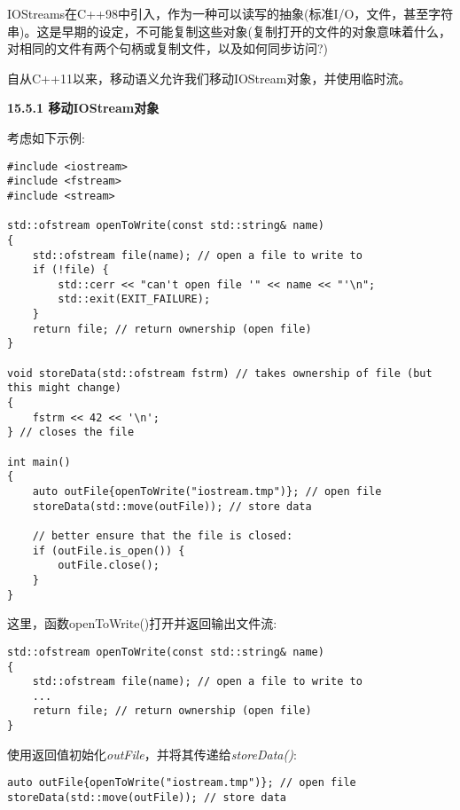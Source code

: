 IOStreams在C++98中引入，作为一种可以读写的抽象(标准I/O，文件，甚至字符串)。这是早期的设定，不可能复制这些对象(复制打开的文件的对象意味着什么，对相同的文件有两个句柄或复制文件，以及如何同步访问?)\par

自从C++11以来，移动语义允许我们移动IOStream对象，并使用临时流。\par

\hspace*{\fill} \par %
\textbf{15.5.1 移动IOStream对象}

考虑如下示例:\par

{\color{red}{lib/outfile.cpp}}\par

\begin{lstlisting}[caption={}]
#include <iostream>
#include <fstream>
#include <stream>

std::ofstream openToWrite(const std::string& name)
{
	std::ofstream file(name); // open a file to write to
	if (!file) {
		std::cerr << "can't open file '" << name << "'\n";
		std::exit(EXIT_FAILURE);
	}
	return file; // return ownership (open file)
}

void storeData(std::ofstream fstrm) // takes ownership of file (but this might change)
{
	fstrm << 42 << '\n';
} // closes the file

int main()
{
	auto outFile{openToWrite("iostream.tmp")}; // open file
	storeData(std::move(outFile)); // store data
	
	// better ensure that the file is closed:
	if (outFile.is_open()) {
		outFile.close();
	}
}
\end{lstlisting}

这里，函数openToWrite()打开并返回输出文件流:\par

\begin{lstlisting}[caption={}]
std::ofstream openToWrite(const std::string& name)
{
	std::ofstream file(name); // open a file to write to
	...
	return file; // return ownership (open file)
}
\end{lstlisting}

使用返回值初始化\textit{outFile}，并将其传递给\textit{storeData()}:\par

\begin{lstlisting}[caption={}]
auto outFile{openToWrite("iostream.tmp")}; // open file
storeData(std::move(outFile)); // store data
\end{lstlisting}

